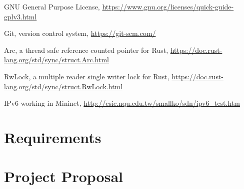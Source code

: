 \documentclass[12pt,a4paper,twoside,openany]{report}
\begin{document}
\begin{thebibliography}{1}
 GNU General Purpose License, \url{https://www.gnu.org/licenses/quick-guide-gplv3.html}

 Git, version control system, \url{https://git-scm.com/}

 Arc, a thread safe reference counted pointer for Rust, \url{https://doc.rust-lang.org/std/sync/struct.Arc.html}

RwLock, a multiple reader single writer lock for Rust, \url{https://doc.rust-lang.org/std/sync/struct.RwLock.html}

 IPv6 working in Mininet, \url{http://csie.nqu.edu.tw/smallko/sdn/ipv6_test.htm}

\end{thebibliography}

\appendix

\chapter{Requirements}
\label{appendix::requirements}



\chapter*{Project Proposal}
\label{project_proposal}


\end{document}
